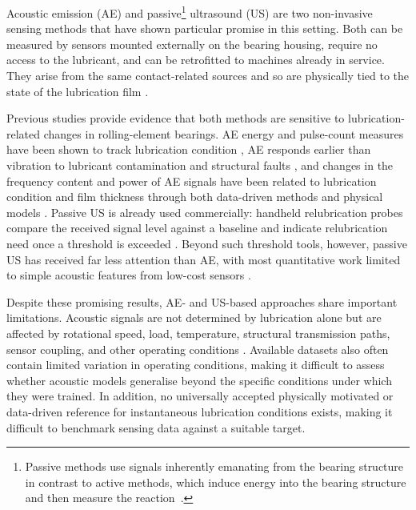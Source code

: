 Acoustic emission (AE) and passive\footnote{Passive methods use signals inherently emanating from the bearing structure in contrast to active methods, which induce energy into the bearing structure and then measure the reaction~\cite{wang_advanced_2024}.} ultrasound (US) are two non-invasive sensing methods that have shown particular promise in this setting. Both can be measured by sensors mounted externally on the bearing housing, require no access to the lubricant, and can be retrofitted to machines already in service. They arise from the same contact-related sources and so are physically tied to the state of the lubrication film \cite{liu_combined_2021,zhang_coupled_2026}.

Previous studies provide evidence that both methods are sensitive to lubrication-related changes in rolling-element bearings. AE energy and pulse-count measures have been shown to track lubrication condition \cite{miettinen_analysis_2001,yoshioka_compound_2009,hou_insitu_2025}, AE responds earlier than vibration to lubricant contamination and structural faults \cite{tandon_ae_2006,cornel_condition_2021,wang_fingerprint_2023}, and changes in the frequency content and power of AE signals have been related to lubrication condition and film thickness through both data-driven methods \cite{renhart_ae_2021} and physical models \cite{liu_combined_2021,zhang_coupled_2026}. Passive US is already used commercially: handheld relubrication probes compare the received signal level against a baseline and indicate relubrication need once a threshold is exceeded \cite{lineham_ultrasonic_2008}. Beyond such threshold tools, however, passive US has received far less attention than AE, with most quantitative work limited to simple acoustic features from low-cost sensors \cite{jakobsen_detecting_2023}.

Despite these promising results, AE- and US-based approaches share important limitations. Acoustic signals are not determined by lubrication alone but are affected by rotational speed, load, temperature, structural transmission paths, sensor coupling, and other operating conditions \cite{renhart_ae_2021,marticorena_cage_2022,shang_comprehensive_2024}. Available datasets also often contain limited variation in operating conditions, making it difficult to assess whether acoustic models generalise beyond the specific conditions under which they were trained. In addition, no universally accepted physically motivated or data-driven reference for instantaneous lubrication conditions exists, making it difficult to benchmark sensing data against a suitable target.

